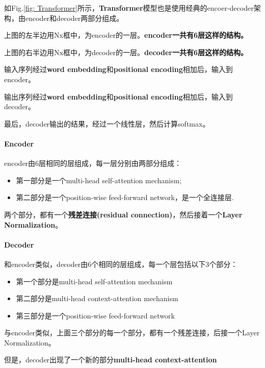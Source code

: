 \documentclass[letterpaper,10pt]{article}
\begin{document}
	如Fig.\ref{fig: Transformer}所示，\textbf{Transformer}模型也是使用经典的encoer-decoder架构，由encoder和decoder两部分组成。
	
	上图的左半边用Nx框中，为encoder的一层。\textbf{encoder一共有6层这样的结构。}
	
	上图的右半边用Nx框中，为decoder的一层。\textbf{decoder一共有6层这样的结构。}
	
	输入序列经过\textbf{word embedding}和\textbf{positional encoding}相加后，输入到encoder。
	
	输出序列经过\textbf{word embedding}和\textbf{positional encoding}相加后，输入到decoder。
	
	最后，decoder输出的结果，经过一个线性层，然后计算softmax。
	
	\paragraph{Encoder}
	
	encoder由6层相同的层组成，每一层分别由两部分组成：
	
	\begin{itemize}
		\item {}
			第一部分是一个multi-head self-attention mechanism;
		\item {}
			第二部分是一个position-wise feed-forward network，是一个全连接层.
	\end{itemize}
	
	两个部分，都有一个\textbf{残差连接(residual connection)}，然后接着一个\textbf{Layer Normalization}。
	
	
	\paragraph{Decoder}
	
	和encoder类似，decoder由6个相同的层组成，每一个层包括以下3个部分：
	
	\begin{itemize}
	\item {}
		第一个部分是multi-head self-attention mechanism
	\item {}
		第二部分是multi-head context-attention mechanism
	\item {}
		第三部分是一个position-wise feed-forward network
	\end{itemize}
	
	与encoder类似，上面三个部分的每一个部分，都有一个残差连接，后接一个Layer Normalization。
	
	但是，decoder出现了一个新的部分\textbf{multi-head context-attention}
	
\end{document}
